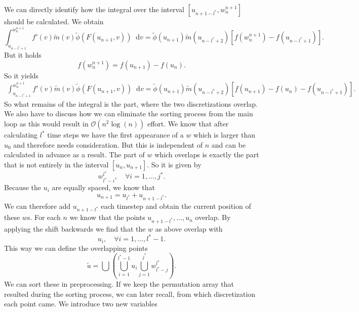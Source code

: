 \documentclass[12pt,a4paper,twoside, open=right]{scrreprt}
\theoremstyle{definition}
\theoremstyle{plain}
\newcommand{\D}{\mathop{}\!\mathrm{d}}
\begin{document}
We can directly identify how the integral over the interval $[u_{n+1-l^*},w^{n+1}_{n}]$ should be calculated. We obtain 
\begin{equation}
    \int_{u_{n-l^*+1}}^{w^{n+1}_n}f'(v)\tilde{m}(v)\tilde{\phi}(F(u_{n+1},v))\D v = \tilde\phi(u_{n+1})\tilde{m}(u_{n-l^*+2})[f(w^{n+1}_n)-f(u_{n-l^*+1})].
\end{equation}
But it holds
\begin{equation}
    f(w^{n+1}_n)=f(u_{n+1})-f(u_n).
\end{equation}
So it yields
\begin{align}
     \int_{u_{n-l^*+1}}^{w^{n+1}_n}f'(v)\tilde{m}(v)\tilde{\phi}(F(u_{n+1},v))\D v = \tilde\phi(u_{n+1})\tilde{m}(u_{n-l^*+2})[f(u_{n+1})-f(u_n)-f(u_{n-l^*+1})].
\end{align}
So what remains of the integral is the part, where the two discretizations overlap. We also have to discuss how we can eliminate the sorting process from the main loop as this would result in $\mathcal{O}(n^2\log(n))$ effort. We know that after calculating $l^*$ time steps we have the first appearance of a $w$ which is larger than $u_0$ and therefore needs consideration. But this is independent of $n$ and can be calculated in advance as a result. The part of $w$ which overlaps is exactly the part that is not entirely in the interval $[u_n,u_{n+1}]$. So it is given by
\begin{equation}
    w^{l^*}_{l^*-i},\quad\forall i=1,\dotsc,j^*.
\end{equation}
Because the $u_i$ are equally spaced, we know that
\begin{equation}
    u_{n+1}=u_{l^*}+u_{n+1-l^*}.
\end{equation}
We can therefore add $u_{n+1-l^*}$ each timestep and obtain the current position of these $w$s. For each $n$ we know that the points $u_{n+1-l^*},\dotsc,u_n$ overlap. By applying the shift backwards we find that the $w$ as above overlap with 
\begin{equation}
    u_i,\quad\forall i=1,\dotsc,l^*-1.
\end{equation}
This way we can define the overlapping points 
\begin{equation}
    \tilde{u}= \bigcup\left(\bigcup_{i=1}^{l^*-1}u_i\bigcup_{j=1}^{j^*}w^{l^*}_{l^*-j}\right).
\end{equation}
We can sort these in preprocessing. If we keep the permutation array that resulted during the sorting process, we can later recall, from which discretization each point came. We introduce two new variables
\end{document}
